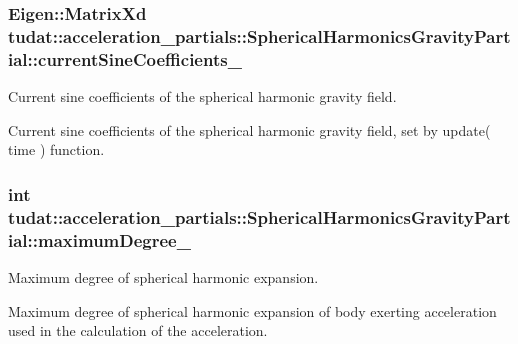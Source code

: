\subsubsection[{\texorpdfstring{current\+Sine\+Coefficients\+\_\+}{currentSineCoefficients_}}]{\setlength{\rightskip}{0pt plus 5cm}Eigen\+::\+Matrix\+Xd tudat\+::acceleration\+\_\+partials\+::\+Spherical\+Harmonics\+Gravity\+Partial\+::current\+Sine\+Coefficients\+\_\+\hspace{0.3cm}{\ttfamily [protected]}}\hypertarget{classtudat_1_1acceleration__partials_1_1SphericalHarmonicsGravityPartial_a61efd1799c484094e1f2a3309817cee2}{}\label{classtudat_1_1acceleration__partials_1_1SphericalHarmonicsGravityPartial_a61efd1799c484094e1f2a3309817cee2}


Current sine coefficients of the spherical harmonic gravity field. 

Current sine coefficients of the spherical harmonic gravity field, set by update( time ) function. 
\subsubsection[{\texorpdfstring{maximum\+Degree\+\_\+}{maximumDegree_}}]{\setlength{\rightskip}{0pt plus 5cm}int tudat\+::acceleration\+\_\+partials\+::\+Spherical\+Harmonics\+Gravity\+Partial\+::maximum\+Degree\+\_\+\hspace{0.3cm}{\ttfamily [protected]}}\hypertarget{classtudat_1_1acceleration__partials_1_1SphericalHarmonicsGravityPartial_ac8a5875d6c430cf8c197b4dbd13e4c58}{}\label{classtudat_1_1acceleration__partials_1_1SphericalHarmonicsGravityPartial_ac8a5875d6c430cf8c197b4dbd13e4c58}


Maximum degree of spherical harmonic expansion. 

Maximum degree of spherical harmonic expansion of body exerting acceleration used in the calculation of the acceleration. 
